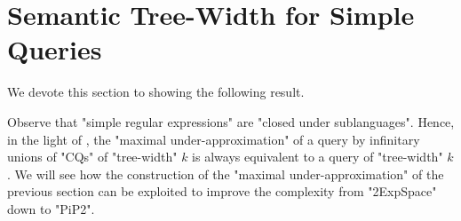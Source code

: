 \section{\AP{}Semantic Tree-Width for Simple Queries}
\label{sec:sre}

We devote this section to showing the following result.

\thmSemTwSREpitwo 

Observe that "simple regular expressions" are "closed under sublanguages". Hence, in the light of
, the "maximal under-approximation" of a {\UCRPQSRE} query by infinitary unions of "CQs" of "tree-width" $k$ is always equivalent to a {\UCRPQSRE} query  of "tree-width" $k$. We will see how the construction of the "maximal under-approximation" of the previous section can be exploited to improve the complexity from "2ExpSpace" down to "PiP2".

